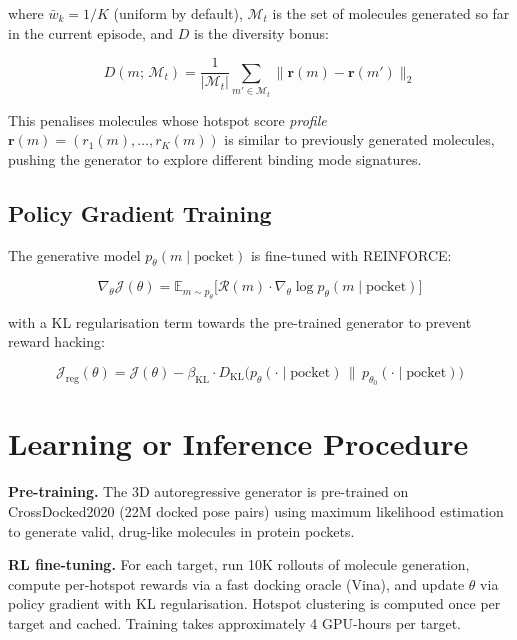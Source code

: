 \documentclass[10pt,twocolumn]{article}
\begin{document}
where $\bar{w}_k = 1/K$ (uniform by default), $\mathcal{M}_{t}$ is the set of molecules generated so far in the current episode, and $D$ is the diversity bonus:

\begin{equation}
D(m;\, \mathcal{M}_t) = \frac{1}{|\mathcal{M}_t|} \sum_{m' \in \mathcal{M}_t} \bigl\|\mathbf{r}(m) - \mathbf{r}(m')\bigr\|_2
\end{equation}

This penalises molecules whose hotspot score \emph{profile} $\mathbf{r}(m) = (r_1(m),\ldots,r_K(m))$ is similar to previously generated molecules, pushing the generator to explore different binding mode signatures.

\subsection*{Policy Gradient Training}

The generative model $p_\theta(m \mid \text{pocket})$ is fine-tuned with REINFORCE:

\begin{equation}
\nabla_\theta \mathcal{J}(\theta) = \mathbb{E}_{m \sim p_\theta}\bigl[\mathcal{R}(m) \cdot \nabla_\theta \log p_\theta(m \mid \text{pocket})\bigr]
\end{equation}

with a KL regularisation term towards the pre-trained generator to prevent reward hacking:

\begin{equation}
\mathcal{J}_{\mathrm{reg}}(\theta) = \mathcal{J}(\theta) - \beta_{\mathrm{KL}} \cdot D_{\mathrm{KL}}\bigl(p_\theta(\cdot \mid \text{pocket}) \,\|\, p_{\theta_0}(\cdot \mid \text{pocket})\bigr)
\end{equation}

\section{Learning or Inference Procedure}

\textbf{Pre-training.}
The 3D autoregressive generator is pre-trained on CrossDocked2020 (22M docked pose pairs) using maximum likelihood estimation to generate valid, drug-like molecules in protein pockets.

\textbf{RL fine-tuning.}
For each target, run 10K rollouts of molecule generation, compute per-hotspot rewards via a fast docking oracle (Vina), and update $\theta$ via policy gradient with KL regularisation.
Hotspot clustering is computed once per target and cached.
Training takes approximately 4 GPU-hours per target.
\end{document}
